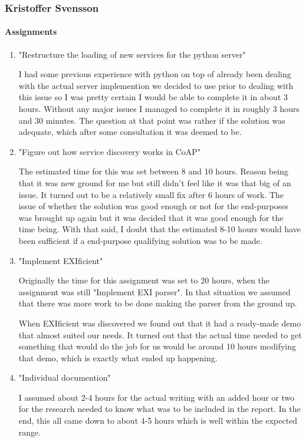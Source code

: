 \subsubsection{Kristoffer Svensson}
\paragraph{Assignments}
\begin{enumerate}
\item{"Restructure the loading of new services for the python server"}

I had some previous experience with python on top of already been dealing with the actual server implemention we decided to use prior to dealing with this issue so I was pretty certain I would be able to complete it in about 3 hours.
Without any major issues I managed to complete it in roughly 3 hours and 30 minutes. The question at that point was rather if the solution was adequate, which after some consultation it was deemed to be.

\item {"Figure out how service discovery works in CoAP"}

The estimated time for this was set between 8 and 10 hours. Reason being that it was new ground for me but still didn't feel like it was that big of
an issue. It turned out to be a relatively small fix after 6 hours of work. The issue of whether the solution was good enough or not for the end-purposes was brought up again but it was decided that it was good enough for the time being.
With that said, I doubt that the estimated 8-10 hours would have been sufficient if a end-purpose qualifying solution was to be made. 

\item {"Implement EXIficient"}

Originally the time for this assignment was set to 20 hours, when the assignment was still "Implement EXI parser". In that situation we assumed that there was more work to be done making the parser from the ground up.

When EXIficient was discovered we found out that it had a ready-made demo that almost suited our needs. It turned out that the actual time needed to get something that would do the job for us would be around 10 hours modifying that demo, which is exactly what ended up happening.

\item {"Individual documention"}

I assumed about 2-4 hours for the actual writing with an added hour or two for the research needed to know what was to be included in the report. In the end, this all came down to about 4-5 hours which is well within the expected range.

\end{enumerate}

